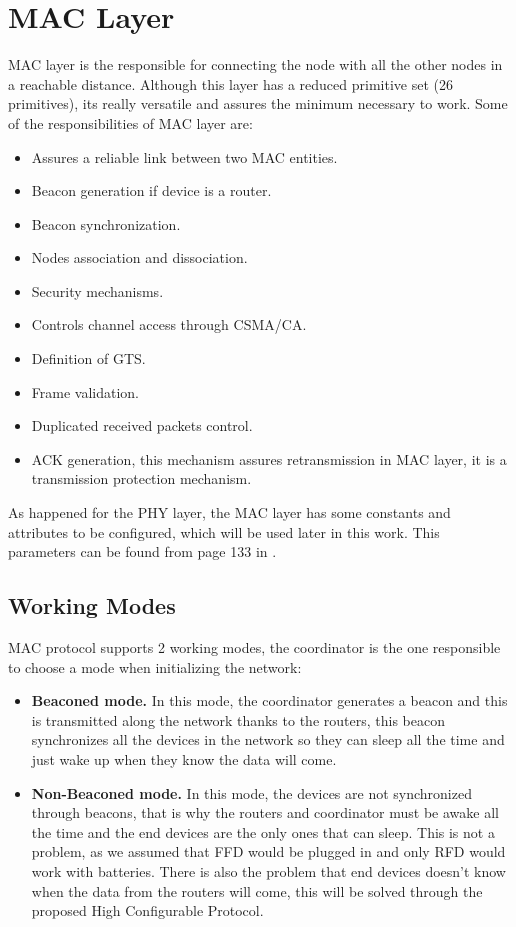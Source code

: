 \section{\ac{MAC} Layer}

\ac{MAC} layer is the responsible for connecting the node with all the other nodes in a reachable distance. Although this layer has a reduced
primitive set (26 primitives), its really versatile and assures the minimum necessary to work. Some of the responsibilities of \ac{MAC}
layer are:

\begin{itemize}
 \item Assures a reliable link between two \ac{MAC} entities.
 \item Beacon generation if device is a router.
 \item Beacon synchronization.
 \item Nodes association and dissociation.
 \item Security mechanisms.
 \item Controls channel access through \ac{CSMA/CA}.
 \item Definition of \ac{GTS}.
 \item Frame validation.
 \item Duplicated received packets control.
 \item \ac{ACK} generation, this mechanism assures retransmission in \ac{MAC} layer, it is a transmission protection mechanism.
\end{itemize}

As happened for the \ac{PHY} layer, the \ac{MAC} layer has some constants and attributes to be configured, which will be used later in this work.
This parameters can be found from page 133 in \cite{IEEE802.15.4-2003}.

\subsection{Working Modes}

\ac{MAC} protocol supports 2 working modes, the coordinator is the one responsible to choose a mode when initializing the network:

\begin{itemize}
 \item \textbf{Beaconed mode.} In this mode, the coordinator generates a beacon and this is transmitted along the network thanks to the routers,
this beacon synchronizes all the devices in the network so they can sleep all the time and just wake up when they know the data will come. 
 \item \textbf{Non-Beaconed mode.} In this mode, the devices are not synchronized through beacons, that is why the routers and coordinator must
be awake all the time and the end devices are the only ones that can sleep. This is not a problem, as we assumed that \ac{FFD} would be plugged 
in and only \ac{RFD} would work with batteries. There is also the problem that end devices doesn't know when the data from the routers will come,
this will be solved through the proposed High Configurable Protocol.
\end{itemize}

